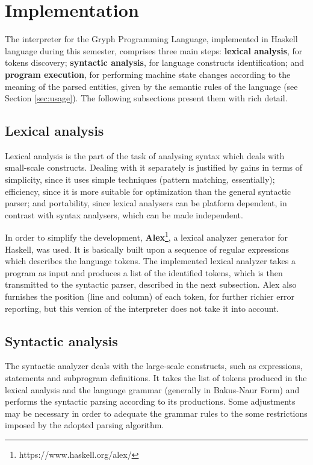 \section{Implementation}
\label{sec:implement}

The interpreter for the Gryph Programming Language,
implemented in Haskell language during this semester, comprises three
main steps: \textbf{lexical analysis}, for tokens discovery;
\textbf{syntactic analysis}, for language constructs
identification; and \textbf{program execution}, for
performing machine state changes according to the
meaning of the parsed entities, given by the semantic
rules of the language (see Section \ref{sec:usage}). The following subsections
present them with rich detail.

\subsection{Lexical analysis}

Lexical analysis is the part of the task of analysing syntax
which deals with small-scale constructs. Dealing with it
separately is justified by gains in terms of simplicity, since
it uses simple techniques (pattern matching, essentially); efficiency, since it is
more suitable for optimization than the general syntactic parser; 
and portability, since lexical analysers can be platform dependent, in contrast
with syntax analysers, which can be made independent.

In order to simplify the development, \textbf{Alex}\footnote{https://www.haskell.org/alex/}, a lexical
analyzer generator for Haskell, was used. It is basically built
upon a sequence of regular expressions which describes the 
language tokens. The implemented lexical analyzer takes a program as input and produces
a list of the identified tokens, which is then transmitted to the
syntactic parser, described in the next subsection. Alex also furnishes
the position (line and column) of each token, for further richier error reporting, but
this version of the interpreter does not take it into account.

\subsection{Syntactic analysis}

The syntactic analyzer deals with the large-scale constructs, 
such as expressions, statements and subprogram definitions.
It takes the list of tokens produced in the lexical
analysis and the language grammar (generally in Bakus-Naur Form) and performs
the syntactic parsing according to its productions.
Some adjustments may be necessary in order
to adequate the grammar rules to the some restrictions imposed by
the adopted parsing algorithm.

